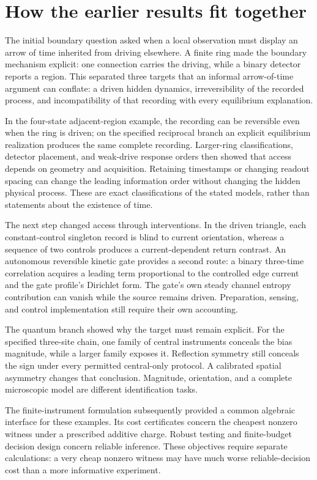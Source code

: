 \section{How the earlier results fit together}

The initial boundary question asked when a local observation must display an
arrow of time inherited from driving elsewhere. A finite ring made the
boundary mechanism explicit: one connection carries the driving, while a
binary detector reports a region. This separated three targets that an
informal arrow-of-time argument can conflate: a driven hidden dynamics,
irreversibility of the recorded process, and incompatibility of that recording
with every equilibrium explanation.

In the four-state adjacent-region example, the recording can be reversible
even when the ring is driven; on the specified reciprocal branch an explicit
equilibrium realization produces the same complete recording. Larger-ring
classifications, detector placement, and weak-drive response orders then
showed that access depends on geometry and acquisition. Retaining timestamps
or changing readout spacing can change the leading information order without
changing the hidden physical process. These are exact classifications of the
stated models, rather than statements about the existence of time.

The next step changed access through interventions. In the driven triangle,
each constant-control singleton record is blind to current orientation,
whereas a sequence of two controls produces a current-dependent return
contrast. An autonomous reversible kinetic gate provides a second route: a
binary three-time correlation acquires a leading term proportional to the
controlled edge current and the gate profile's Dirichlet form. The gate's own
steady channel entropy contribution can vanish while the source remains
driven. Preparation, sensing, and control implementation still require their
own accounting.

The quantum branch showed why the target must remain explicit. For the
specified three-site chain, one family of central instruments conceals the
bias magnitude, while a larger family exposes it. Reflection symmetry still
conceals the sign under every permitted central-only protocol. A calibrated
spatial asymmetry changes that conclusion. Magnitude, orientation, and a
complete microscopic model are different identification tasks.

The finite-instrument formulation subsequently provided a common algebraic
interface for these examples. Its cost certificates concern the cheapest
nonzero witness under a prescribed additive charge. Robust testing and
finite-budget decision design concern reliable inference. These objectives
require separate calculations: a very cheap nonzero witness may have much
worse reliable-decision cost than a more informative experiment.

